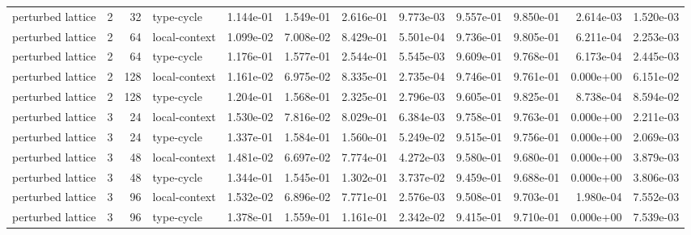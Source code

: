 \begin{tabular}{lrrlrrrrrrrr}
perturbed lattice & 2 & 32 & type-cycle & 1.144e-01 & 1.549e-01 & 2.616e-01 & 9.773e-03 & 9.557e-01 & 9.850e-01 & 2.614e-03 & 1.520e-03 \\
perturbed lattice & 2 & 64 & local-context & 1.099e-02 & 7.008e-02 & 8.429e-01 & 5.501e-04 & 9.736e-01 & 9.805e-01 & 6.211e-04 & 2.253e-03 \\
perturbed lattice & 2 & 64 & type-cycle & 1.176e-01 & 1.577e-01 & 2.544e-01 & 5.545e-03 & 9.609e-01 & 9.768e-01 & 6.173e-04 & 2.445e-03 \\
perturbed lattice & 2 & 128 & local-context & 1.161e-02 & 6.975e-02 & 8.335e-01 & 2.735e-04 & 9.746e-01 & 9.761e-01 & 0.000e+00 & 6.151e-02 \\
perturbed lattice & 2 & 128 & type-cycle & 1.204e-01 & 1.568e-01 & 2.325e-01 & 2.796e-03 & 9.605e-01 & 9.825e-01 & 8.738e-04 & 8.594e-02 \\
perturbed lattice & 3 & 24 & local-context & 1.530e-02 & 7.816e-02 & 8.029e-01 & 6.384e-03 & 9.758e-01 & 9.763e-01 & 0.000e+00 & 2.211e-03 \\
perturbed lattice & 3 & 24 & type-cycle & 1.337e-01 & 1.584e-01 & 1.560e-01 & 5.249e-02 & 9.515e-01 & 9.756e-01 & 0.000e+00 & 2.069e-03 \\
perturbed lattice & 3 & 48 & local-context & 1.481e-02 & 6.697e-02 & 7.774e-01 & 4.272e-03 & 9.580e-01 & 9.680e-01 & 0.000e+00 & 3.879e-03 \\
perturbed lattice & 3 & 48 & type-cycle & 1.344e-01 & 1.545e-01 & 1.302e-01 & 3.737e-02 & 9.459e-01 & 9.688e-01 & 0.000e+00 & 3.806e-03 \\
perturbed lattice & 3 & 96 & local-context & 1.532e-02 & 6.896e-02 & 7.771e-01 & 2.576e-03 & 9.508e-01 & 9.703e-01 & 1.980e-04 & 7.552e-03 \\
perturbed lattice & 3 & 96 & type-cycle & 1.378e-01 & 1.559e-01 & 1.161e-01 & 2.342e-02 & 9.415e-01 & 9.710e-01 & 0.000e+00 & 7.539e-03 \\
\bottomrule
\end{tabular}

